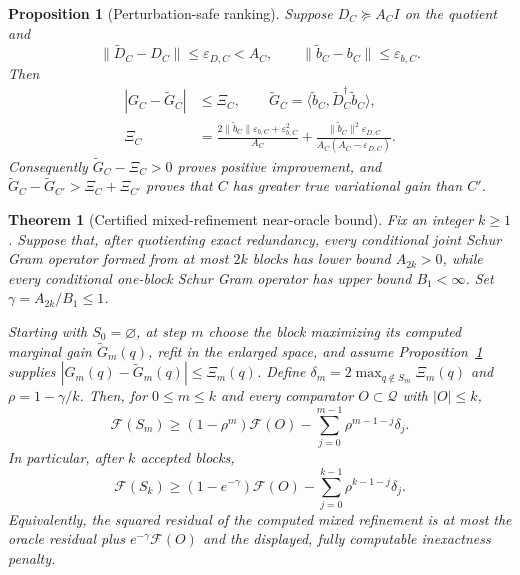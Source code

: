 \documentclass[10pt,a4paper]{amsart}
\newtheorem{proposition}{Proposition}
\newtheorem{theorem}{Theorem}
\begin{document}
\begin{proposition}[Perturbation-safe ranking]
\label{prop:main-safe-ranking}
Suppose $D_C\succeq A_CI$ on the quotient and
\[
 \|\widetilde D_C-D_C\|\leq\varepsilon_{D,C}<A_C,
 \qquad
 \|\widetilde b_C-b_C\|\leq\varepsilon_{b,C}.
\]
Then
\begin{align}
 |G_C-\widetilde G_C|&\leq\Xi_C,\qquad
 \widetilde G_C=\langle\widetilde b_C,
                         \widetilde D_C^\dagger\widetilde b_C\rangle,\\
 \Xi_C&=
 \frac{2\|\widetilde b_C\|\varepsilon_{b,C}+\varepsilon_{b,C}^2}{A_C}
 +\frac{\|\widetilde b_C\|^2\varepsilon_{D,C}}
 {A_C(A_C-\varepsilon_{D,C})}.
 \label{eq:main-ranking-margin}
\end{align}
Consequently $\widetilde G_C-\Xi_C>0$ proves positive improvement, and
$\widetilde G_C-\widetilde G_{C'}>\Xi_C+\Xi_{C'}$ proves that $C$ has greater
true variational gain than $C'$.
\end{proposition}

\begin{theorem}[Certified mixed-refinement near-oracle bound]
\label{thm:mixed-near-oracle}
Fix an integer $k\geq1$.  Suppose that, after quotienting exact redundancy,
every conditional joint Schur Gram operator formed from at most $2k$ blocks
has lower bound $A_{2k}>0$, while every conditional one-block Schur Gram
operator has upper bound $B_1<\infty$.  Set
$\gamma=A_{2k}/B_1\leq1$.

Starting with $S_0=\varnothing$, at step $m$ choose the block maximizing its
computed marginal gain $\widetilde G_m(q)$, refit in the enlarged space, and
assume Proposition~\ref{prop:main-safe-ranking} supplies
$|G_m(q)-\widetilde G_m(q)|\leq\Xi_m(q)$.  Define
$\delta_m=2\max_{q\notin S_m}\Xi_m(q)$ and
$\rho=1-\gamma/k$.  Then, for $0\leq m\leq k$ and every comparator
$O\subset\mathcal Q$ with $|O|\leq k$,
\begin{equation}
 \mathcal F(S_m)\geq
 (1-\rho^m)\mathcal F(O)
 -\sum_{j=0}^{m-1}\rho^{m-1-j}\delta_j .
 \label{eq:mixed-near-oracle}
\end{equation}
In particular, after $k$ accepted blocks,
\begin{equation}
 \mathcal F(S_k)\geq
 (1-e^{-\gamma})\mathcal F(O)
 -\sum_{j=0}^{k-1}\rho^{k-1-j}\delta_j .
 \label{eq:mixed-near-oracle-k}
\end{equation}
Equivalently, the squared residual of the computed mixed refinement is at
most the oracle residual plus
$e^{-\gamma}\mathcal F(O)$ and the displayed, fully computable inexactness
penalty.
\end{theorem}
\end{document}
